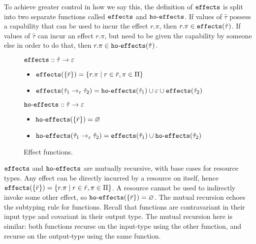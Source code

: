 To achieve greater control in how we say this, the definition of $\mathtt{effects}$ is split into two separate functions called $\mathtt{effects}$ and $\mathtt{ho \hbox{-} effects}$. If values of $\hat \tau$ possess a capability that can be used to incur the effect $r.\pi$, then $r.\pi \in \mathtt{effects}(\hat \tau)$. If values of $\hat \tau$ can incur an effect $r.\pi$, but need to be given the capability by someone else in order to do that, then $r.\pi \in \mathtt{ho \hbox{-} effects}(\hat \tau)$.


\begin{figure}[h]

$\mathtt{effects} :: \hat \tau \rightarrow \varepsilon$

\begin{itemize}
	\setlength\itemsep{-0.2em}
	\item[] $\mathtt{effects}(\{ \bar r \}) = \{ r.\pi \mid r \in \bar r, \pi \in \Pi \}$
	\item[] $\mathtt{effects}(\hat \tau_1 \rightarrow_{\varepsilon} \hat \tau_2) = \mathtt{ho \hbox{-} effects}(\hat \tau_1) \cup \varepsilon \cup \mathtt{effects}(\hat \tau_2)$
\end{itemize}

$\mathtt{ho \hbox{-} effects} :: \hat \tau \rightarrow \varepsilon$

\begin{itemize}
	\setlength\itemsep{-0.2em}
	\item[] $\mathtt{ho \hbox{-} effects}(\{ \bar r \}) = \varnothing$
	\item[] $\mathtt{ho \hbox{-} effects}(\hat \tau_1 \rightarrow_{\varepsilon} \hat \tau_2) = \mathtt{effects}(\hat \tau_1) \cup \mathtt{ho \hbox{-} effects}(\hat \tau_2)$
\end{itemize}

\caption{Effect functions.}
\label{fig:fx_defns}
\end{figure}

$\mathtt{effects}$ and $\mathtt{ho \hbox{-} effects}$ are mutually recursive, with base cases for resource types. Any effect can be directly incurred by a resource on itself, hence $\mathtt{effects}(\{ \bar r \}) = \{ r.\pi \mid r \in \bar r, \pi \in \Pi \}$. A resource cannot be used to indirectly invoke some other effect, so $\mathtt{ho \hbox{-} effects}(\{ \bar r \}) = \varnothing$. The mutual recursion echoes the subtyping rule for functions. Recall that functions are contravariant in their input type and covariant in their output type. The mutual recursion here is similar: both functions recurse on the input-type using the other function, and recurse on the output-type using the same function.

